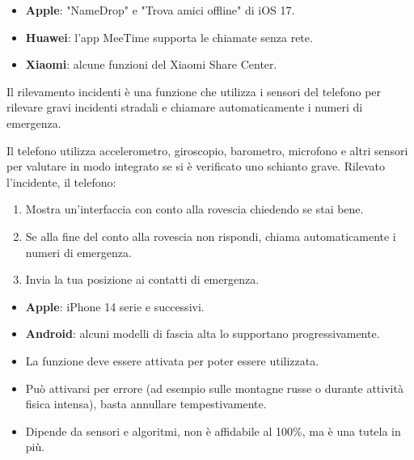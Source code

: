 
\begin{itemize}
  \item \textbf{Apple}: "NameDrop" e "Trova amici offline" di iOS 17.
  \item \textbf{Huawei}: l'app MeeTime supporta le chiamate senza rete.
  \item \textbf{Xiaomi}: alcune funzioni del Xiaomi Share Center.
\end{itemize}


Il rilevamento incidenti è una funzione che utilizza i sensori del telefono per rilevare gravi incidenti stradali e chiamare automaticamente i numeri di emergenza.


Il telefono utilizza accelerometro, giroscopio, barometro, microfono e altri sensori per valutare in modo integrato se si è verificato uno schianto grave. Rilevato l'incidente, il telefono:

\begin{enumerate}
  \item Mostra un'interfaccia con conto alla rovescia chiedendo se stai bene.
  \item Se alla fine del conto alla rovescia non rispondi, chiama automaticamente i numeri di emergenza.
  \item Invia la tua posizione ai contatti di emergenza.
\end{enumerate}


\begin{itemize}
  \item \textbf{Apple}: iPhone 14 serie e successivi.
  \item \textbf{Android}: alcuni modelli di fascia alta lo supportano progressivamente.
\end{itemize}


\begin{itemize}
  \item La funzione deve essere attivata per poter essere utilizzata.
  \item Può attivarsi per errore (ad esempio sulle montagne russe o durante attività fisica intensa), basta annullare tempestivamente.
  \item Dipende da sensori e algoritmi, non è affidabile al 100\%, ma è una tutela in più.
\end{itemize}

